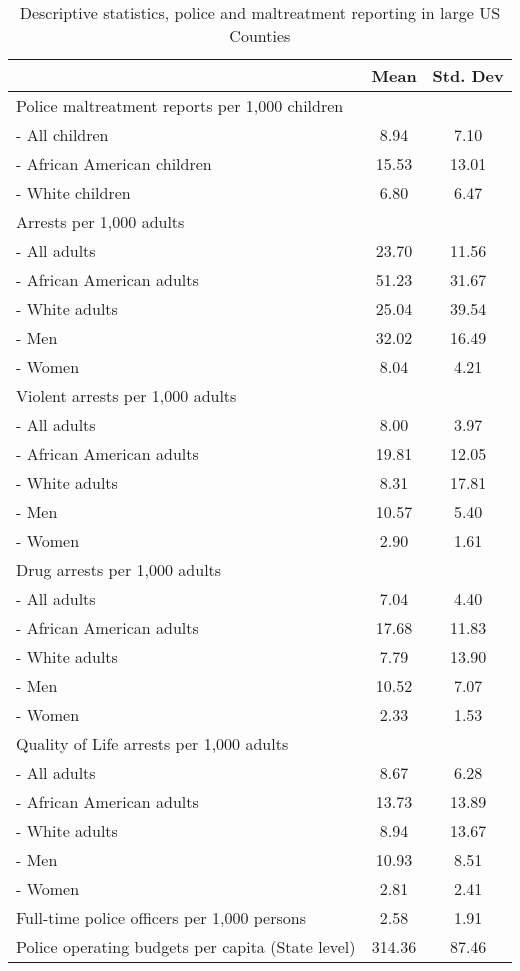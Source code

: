 \begin{table}[ht]
\centering
\caption{Descriptive statistics, police and maltreatment reporting in large US Counties} 
\label{desc3}
\begin{tabular}{lcc}
  \hline
  & Mean & Std. Dev \\ 
  \hline
Police maltreatment reports per 1,000 children &  &  \\ 
         - All children & 8.94 & 7.10 \\ 
         - African American children & 15.53 & 13.01 \\ 
         - White children & 6.80 & 6.47 \\ 
  Arrests per 1,000 adults &  &  \\ 
         - All adults & 23.70 & 11.56 \\ 
         - African American adults & 51.23 & 31.67 \\ 
         - White adults & 25.04 & 39.54 \\ 
         - Men & 32.02 & 16.49 \\ 
         - Women & 8.04 & 4.21 \\ 
  Violent arrests per 1,000 adults &  &  \\ 
         - All adults & 8.00 & 3.97 \\ 
         - African American adults & 19.81 & 12.05 \\ 
         - White adults & 8.31 & 17.81 \\ 
         - Men & 10.57 & 5.40 \\ 
         - Women & 2.90 & 1.61 \\ 
  Drug arrests per 1,000 adults &  &  \\ 
         - All adults & 7.04 & 4.40 \\ 
         - African American adults & 17.68 & 11.83 \\ 
         - White adults & 7.79 & 13.90 \\ 
         - Men & 10.52 & 7.07 \\ 
         - Women & 2.33 & 1.53 \\ 
  Quality of Life arrests per 1,000 adults &  &  \\ 
         - All adults & 8.67 & 6.28 \\ 
         - African American adults & 13.73 & 13.89 \\ 
         - White adults & 8.94 & 13.67 \\ 
         - Men & 10.93 & 8.51 \\ 
         - Women & 2.81 & 2.41 \\ 
  Full-time police officers per 1,000 persons & 2.58 & 1.91 \\ 
  Police operating budgets per capita (State level) & 314.36 & 87.46 \\ 
   \hline
\end{tabular}
\end{table}
